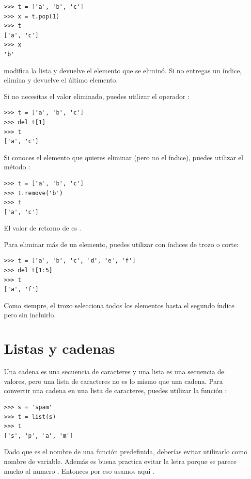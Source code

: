 \begin{Verbatim}[frame=single]
>>> t = ['a', 'b', 'c']
>>> x = t.pop(1)
>>> t
['a', 'c']
>>> x
'b'
\end{Verbatim}
%
 modifica la lista y devuelve el elemento que se eliminó.
Si no entregas un índice, elimina y devuelve el
último elemento.

Si no necesitas el valor eliminado, puedes utilizar el
operador :

\begin{Verbatim}[frame=single]
>>> t = ['a', 'b', 'c']
>>> del t[1]
>>> t
['a', 'c']
\end{Verbatim}
%
Si conoces el elemento que quieres eliminar (pero no el índice),
puedes utilizar el método :

\begin{Verbatim}[frame=single]
>>> t = ['a', 'b', 'c']
>>> t.remove('b')
>>> t
['a', 'c']
\end{Verbatim}
%
El valor de retorno de  es .

Para eliminar más de un elemento, puedes utilizar  con
índices de trozo o corte:

\begin{Verbatim}[frame=single]
>>> t = ['a', 'b', 'c', 'd', 'e', 'f']
>>> del t[1:5]
>>> t
['a', 'f']
\end{Verbatim}
%
Como siempre, el trozo selecciona todos los elementos hasta el segundo índice
pero sin incluirlo.



\section{Listas y cadenas}

Una cadena es una secuencia de caracteres y una lista es una secuencia
de valores, pero una lista de caracteres no es lo mismo que una
cadena.  Para convertir una cadena en una lista de caracteres,
puedes utilizar la función :

\begin{Verbatim}[frame=single]
>>> s = 'spam'
>>> t = list(s)
>>> t
['s', 'p', 'a', 'm']
\end{Verbatim}
%
Dado que  es el nombre de una función predefinida, deberías
evitar utilizarlo como nombre de variable.  Además es buena practica evitar la letra  porque se parece mucho al numero .  Entonces por eso usamos aqui .

